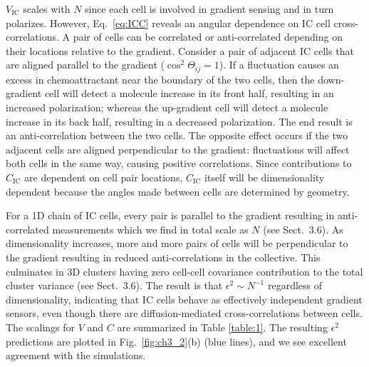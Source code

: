 $V_\text{IC}$ scales with $N$ since each cell is involved in gradient sensing and in turn polarizes. However, Eq.\ \ref{eq:ICC} reveals an angular dependence on IC cell cross-correlations. A pair of cells can be correlated or anti-correlated depending on their locations relative to the gradient. Consider a pair of adjacent IC cells that are aligned parallel to the gradient ($\cos^2\Theta_{ij}=1$).
If a fluctuation causes an excess in chemoattractant near the boundary of the two cells, then the down-gradient cell will detect a molecule increase in its front half, resulting in an increased polarization; whereas the up-gradient cell will detect a molecule increase in its back half, resulting in a decreased polarization. The end result is an anti-correlation between the two cells. The opposite effect occurs if the two adjacent cells are aligned perpendicular to the gradient: fluctuations will affect both cells in the same way, causing positive correlations. Since contributions to $C_\text{IC}$ are dependent on cell pair locations, $C_\text{IC}$ itself will be dimensionality dependent because the angles made between cells are determined by geometry.

For a 1D chain of IC cells, every pair is parallel to the gradient resulting in anti-correlated measurements which we find in total scale as $N$ (see Sect.\ 3.6). As dimensionality increases, more and more pairs of cells will be perpendicular to the gradient resulting in reduced anti-correlations in the collective. This culminates in 3D clusters having zero cell-cell covariance contribution to the total cluster variance (see Sect.\ 3.6). The result is that $\epsilon^2 \sim N^{-1}$ regardless of dimensionality, indicating that IC cells behave as effectively independent gradient sensors, even though there are diffusion-mediated cross-correlations between cells. The scalings for $V$ and $C$ are summarized in Table \ref{table:1}. The resulting $\epsilon^2$ predictions are plotted in Fig.\ \ref{fig:ch3_2}(b) (blue lines), and we see excellent agreement with the simulations.


